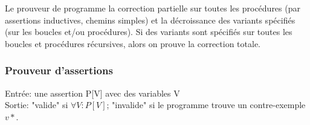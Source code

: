 Le prouveur de programme la correction partielle sur toutes les procédures (par assertions inductives, chemins simples)
 et la décroissance des variants spécifiés (sur les boucles et/ou procédures). Si des variants sont spécifiés sur toutes les boucles et procédures récursives, alors on prouve la correction totale.
 
\subsubsection{Prouveur d'assertions}
Entrée: une assertion P[V] avec des variables V \\
Sortie: "valide" si $\forall V : P[V]$; "invalide"  si le programme trouve un contre-exemple $v*$.
